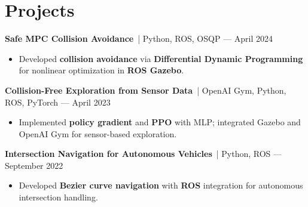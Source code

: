 \documentclass[9.5pt,letterpaper]{article}
\begin{document}
\section*{Projects}
\textbf{Safe MPC Collision Avoidance} \,{\small| Python, ROS, OSQP --- April 2024}
\begin{itemize}
    \item Developed \textbf{collision avoidance} via \textbf{Differential Dynamic Programming} for nonlinear optimization in \textbf{ROS Gazebo}.
\end{itemize}

\textbf{Collision-Free Exploration from Sensor Data} \,{\small| OpenAI Gym, Python, ROS, PyTorch --- April 2023}
\begin{itemize}
    \item Implemented \textbf{policy gradient} and \textbf{PPO} with MLP; integrated Gazebo and OpenAI Gym for sensor-based exploration.
\end{itemize}

\textbf{Intersection Navigation for Autonomous Vehicles} \,{\small| Python, ROS --- September 2022}
\begin{itemize}
    \item Developed \textbf{Bezier curve navigation} with \textbf{ROS} integration for autonomous intersection handling.
\end{itemize}
\end{document}
